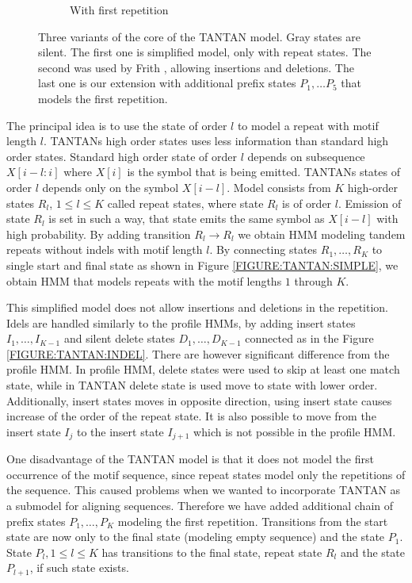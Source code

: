 \begin{figure}
\begin{center}
\begin{subfigure}{0.35\textwidth}
\caption{With first repetition}\label{FIGURE:TANTAN:INIT}
\end{subfigure}%
\end{center}
\caption{Three variants of the core of the TANTAN model. Gray states are
silent. The first one is simplified model, only with repeat states. The second
was used by Frith \cite{Frith2011}, allowing insertions and deletions.  The last one
is our extension with additional prefix states $P_1, \dots P_5$ that models
the first repetition.}\label{FIGURE:TANTAN}
\end{figure}

The principal idea is to use the state of order $l$ to model a repeat with
motif length $l$. TANTANs high order states uses less information than standard
high order states.  Standard high order state of order $l$ depends on
subsequence $X[i-l:i]$ where $X[i]$ is the symbol that is being emitted.
TANTANs states of order $l$ depends only on the symbol $X[i-l]$. Model consists
from $K$ high-order states $R_l$, $1\leq l\leq K$ called repeat states, where
state $R_l$ is of order $l$. Emission of state $R_l$ is set in such a way, that
state emits the same symbol as $X[i-l]$ with high probability. By adding
transition $R_l\to R_l$ we obtain HMM modeling tandem repeats without indels
with motif length $l$. By connecting states $R_1,\dots, R_K$ to single start
and final state as shown in Figure \ref{FIGURE:TANTAN:SIMPLE}, we obtain HMM
that models repeats with the motif lengths $1$ through $K$.

This simplified model does not allow insertions and deletions in the
repetition.  Idels are handled similarly to the profile HMMs, by adding insert
states $I_1,\dots, I_{K-1}$ and silent delete states $D_1, \dots, D_{K-1}$
connected as in the Figure \ref{FIGURE:TANTAN:INDEL}. There are however
significant difference from the profile HMM.  In profile HMM, delete states
were used to skip at least one match state, while in TANTAN delete state is
used move to state with lower order. Additionally, insert states moves in
opposite direction, using insert state causes increase of the order of the
repeat state.  It is also possible to move from the insert state $I_{j}$ to the
insert state $I_{j+1}$ which is not possible in the profile HMM.

One disadvantage of the TANTAN model is that it does not model the first
occurrence of the motif sequence, since repeat states model only the
repetitions of the sequence. This caused problems when we wanted to incorporate
TANTAN as a submodel for aligning sequences. Therefore we have added additional
chain of prefix states $P_1,\dots, P_K$ modeling the first repetition. Transitions
from the start state are now only to the final state (modeling empty sequence) and
the state $P_1$. State $P_l, 1\leq l\leq K$ has transitions to the final state,
repeat state $R_l$ and the state $P_{l+1}$, if such state exists.


